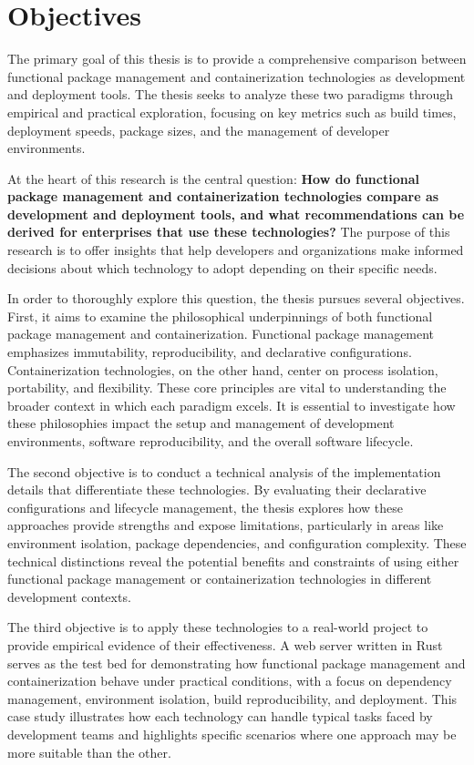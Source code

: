 \section{Objectives}

The primary goal of this thesis is to provide a comprehensive comparison between
functional package management and containerization technologies as development and
deployment tools. The thesis seeks to analyze these two paradigms through empirical
and practical exploration, focusing on key metrics such as build times, deployment
speeds, package sizes, and the management of developer environments.

At the heart of this research is the central question: \textbf{How do functional package
	management and containerization technologies compare as development and deployment
	tools, and what recommendations can be derived for enterprises that use these
	technologies?} The purpose of this research is to offer insights that help developers
and organizations make informed decisions about which technology to adopt depending
on their specific needs.

In order to thoroughly explore this question, the thesis pursues several objectives.
First, it aims to examine the philosophical underpinnings of both functional package
management and containerization. Functional package management emphasizes immutability,
reproducibility, and declarative configurations. Containerization technologies, on
the other hand, center on process isolation, portability, and flexibility. These core
principles are vital to understanding the broader context in which each paradigm
excels. It is essential to investigate how these philosophies impact the setup and
management of development environments, software reproducibility, and the overall
software lifecycle.

The second objective is to conduct a technical analysis of the implementation details
that differentiate these technologies. By evaluating their declarative configurations
and lifecycle management, the thesis explores how these approaches provide strengths
and expose limitations, particularly in areas like environment isolation, package
dependencies, and configuration complexity. These technical distinctions reveal the
potential benefits and constraints of using either functional package management or
containerization technologies in different development contexts.

The third objective is to apply these technologies to a real-world project to provide
empirical evidence of their effectiveness. A web server written in Rust serves as the
test bed for demonstrating how functional package management and containerization
behave under practical conditions, with a focus on dependency management, environment
isolation, build reproducibility, and deployment. This case study illustrates how each
technology can handle typical tasks faced by development teams and highlights specific
scenarios where one approach may be more suitable than the other.

